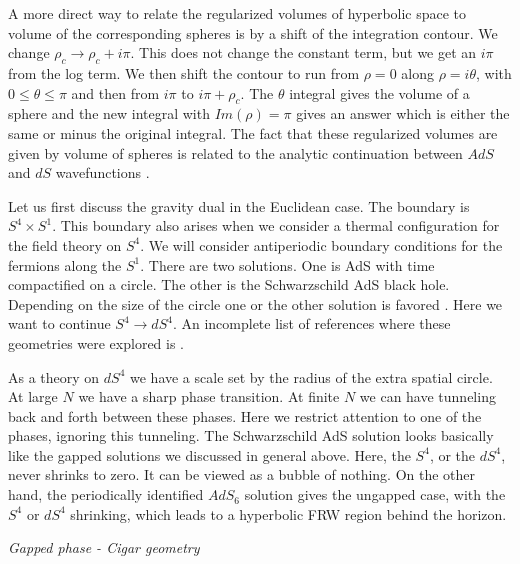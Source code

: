 A more direct way to relate the regularized volumes of hyperbolic space to volume of the
corresponding spheres is by a shift of the integration contour. We change $\rho_c \to \rho_c + 
i \pi $. This does not change the constant term, but we get an $i \pi$ from the log term. 
We then shift the contour to run from $\rho=0$ along $\rho = i \theta$, with $0 \leq \theta \leq 
\pi $ and then from $i\pi $ to $i\pi + \rho_c$. The $\theta$ integral gives the volume of 
a sphere and the new integral with $Im(\rho) = \pi$ gives an answer which is either the same
or minus the original integral. 
The fact that these regularized volumes are given by volume of spheres is related to the 
analytic continuation between $AdS$ and $dS$ wavefunctions . 




Let us first discuss the gravity dual in the Euclidean case. The boundary is $S^4 \times S^1$.
This boundary also arises when we consider a thermal configuration for the field theory on $S^4$.
We will consider antiperiodic boundary conditions for the fermions along the $S^1$. There
are two solutions. One is AdS with time compactified on a circle. The other is the Schwarzschild AdS
black hole. Depending on the size of the circle one or the other solution is favored . Here we want to continue $S^4 \to dS^4$.  An incomplete list of
references where these geometries were explored is  .  

As a theory on $dS^4$ we have
a scale set by the radius of the extra spatial circle. At large $N$ we have a sharp phase transition. At finite
$N$ we can have tunneling back and forth between these phases. Here we restrict attention to
one of the phases, ignoring this tunneling.
The Schwarzschild AdS solution   looks
 basically like the gapped solutions we discussed in general above.
Here, the $S^4$, or the $dS^4$, never shrinks to zero. It can be viewed as a bubble of nothing.
 On the other hand, the periodically identified $AdS_6$
solution gives the ungapped case, with the $S^4$ or $dS^4$ shrinking, which leads to a hyperbolic FRW
region behind the horizon.

{\it Gapped phase - Cigar geometry}

\ifig{} {}

